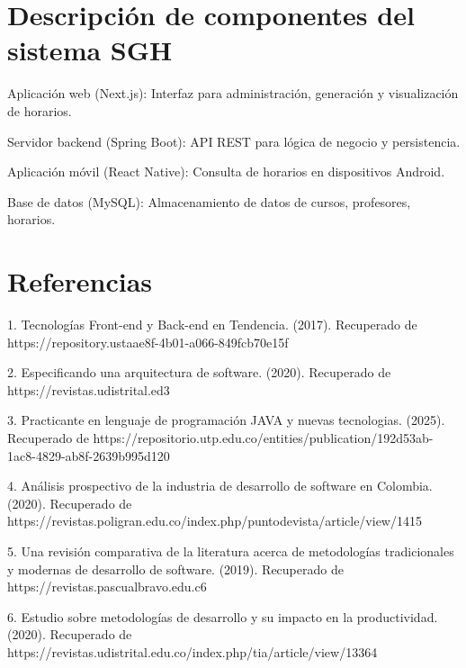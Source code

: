 \appendix
\section{Descripción de componentes del sistema SGH}
Aplicación web (Next.js): Interfaz para administración, generación y visualización de horarios.

Servidor backend (Spring Boot): API REST para lógica de negocio y persistencia.

Aplicación móvil (React Native): Consulta de horarios en dispositivos Android.

Base de datos (MySQL): Almacenamiento de datos de cursos, profesores, horarios.

\section{Referencias}
1. Tecnologías Front-end y Back-end en Tendencia. (2017). Recuperado de https://repository.ustaae8f-4b01-a066-849fcb70e15f

2. Especificando una arquitectura de software. (2020). Recuperado de https://revistas.udistrital.ed3

3. Practicante en lenguaje de programación JAVA y nuevas tecnologias. (2025). Recuperado de https://repositorio.utp.edu.co/entities/publication/192d53ab-1ac8-4829-ab8f-2639b995d120

4. Análisis prospectivo de la industria de desarrollo de software en Colombia. (2020). Recuperado de https://revistas.poligran.edu.co/index.php/puntodevista/article/view/1415

5. Una revisión comparativa de la literatura acerca de metodologías tradicionales y modernas de desarrollo de software. (2019). Recuperado de https://revistas.pascualbravo.edu.c6

6. Estudio sobre metodologías de desarrollo y su impacto en la productividad. (2020). Recuperado de https://revistas.udistrital.edu.co/index.php/tia/article/view/13364